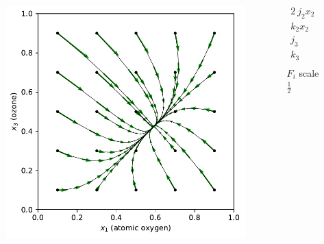 \begin{columns}
\begin{column}{0.65\textwidth}
\vspace{-0.35in}
\begin{figure}
\includegraphics[scale=0.65]{../plots/chapman_trajectory.pdf}
\end{figure}
\end{column}
\begin{column}{0.35\textwidth}
\vspace{-0.35in}
\begin{align*}
2 \ j_2 x_2 &= 0.1 \\
k_2 x_2 &= 0.3 \\
j_3 &= 0.3 \\
k_3 &= 0.2 \\
\end{align*}
\hspace{0.4in} $F_i$ scale $\frac{1}{2}$
\end{column}
\end{columns}
